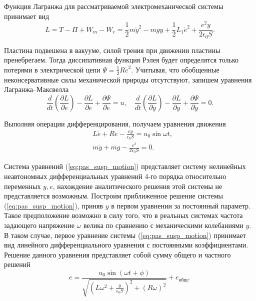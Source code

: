 Функция Лагранжа для рассматриваемой электромеханической системы принимает вид
\[
L = T - \Pi + W_m - W_e = \frac{1}{2}m \dot y^2 - mgy + \frac{1}{2}L_1 \dot e^2 + \frac{e^2 y}{2 \epsilon_0 S}.
\]

Пластина подвешена в вакууме, силой трения при движении пластины пренебрегаем. Тогда диссипативная функция Рэлея будет определятся только потерями в электрической цепи $\Psi = \frac{1}{2}R \dot e^2$. Учитывая, что обобщенные неконсервативные силы механической природы отсутствуют, запишем уравнения Лагранжа–Максвелла \cite{Martynenko_andyn}
\[
\frac{d}{dt} \left( \frac{\partial L}{\partial \dot e} \right) - \frac{\partial L}{\partial e} + \frac{\partial \Psi}{\partial \dot e} = u, \quad
\frac{d}{dt} \left( \frac{\partial L}{\partial \dot y} \right) - \frac{\partial L}{\partial y} + \frac{\partial \Psi}{\partial \dot y} = 0.
\]

Выполняя операции дифференцирования, получаем уравнения движения
\begin{equation}
  \label{eq:pas_susp_motion}
    \begin{alignedat}{2}
    &L \ddot e + R \dot e - \frac{e y}{\epsilon_0 S} = u_0 \sin \omega t, \\
    &m \ddot y + m g - \frac{e^2}{2 \epsilon_0 S} = 0.
    \end{alignedat}
\end{equation}

Система уравнений (\ref{eq:pas_susp_motion}) представляет систему нелинейных неавтономных дифференциальных уравнений 4-го порядка относительно переменных $y, e$, нахождение аналитического решения этой системы не представляется возможным.
Построим приближенное решение системы (\ref{eq:pas_susp_motion}), приняв $y$ в первом уравнении за постоянный параметр. Такое предположение возможно в силу того, что в реальных системах частота задающего напряжение $\omega$  велика по сравнению с механическими колебаниями $y$. В таком случае, первое уравнение системы (\ref{eq:pas_susp_motion}) принимает вид линейного дифференциального уравнения с постоянными коэффициентами. Решение данного уравнения представляет собой сумму общего и частного решений \cite{Martynenko}
\begin{equation}
  \label{eq:pas_susp_charge}
    e = \frac{u_0 \sin (\omega t + \phi)}{\sqrt{\left(L \omega^2 + \frac{y}{\epsilon_0 S} \right)^2 
    + \left( R \omega \right)^2}} + e_{\text{общ}},
\end{equation}

